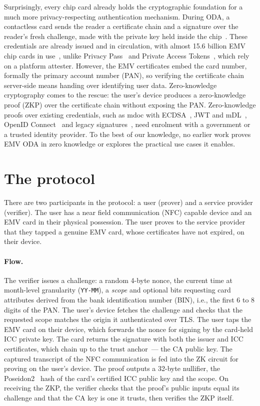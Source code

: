 \documentclass[10pt,a4paper]{article}
\begin{document}
Surprisingly, every chip card already holds the cryptographic foundation for a much more privacy-respecting authentication mechanism.
During ODA, a contactless card sends the reader a certificate chain and a signature over the reader's fresh challenge, made with the private key held inside the chip~\cite{emv-book2}.
These credentials are already issued and in circulation, with almost 15.6 billion EMV chip cards in use~\cite{emvco-stats}, unlike Privacy Pass~\cite{privacypass} and Private Access Tokens~\cite{apple-pat}, which rely on a platform attester.
However, the EMV certificates embed the card number, formally the primary account number (PAN), so verifying the certificate chain server-side means handing over identifying user data.
Zero-knowledge cryptography comes to the rescue: the user's device produces a zero-knowledge proof (ZKP) over the certificate chain without exposing the PAN.
Zero-knowledge proofs over existing credentials, such as mdoc with ECDSA~\cite{DBLP:journals/cic/FrigoS26}, JWT and mDL~\cite{DBLP:journals/iacr/PaquinPZ24}, OpenID Connect~\cite{DBLP:conf/ccs/BaldimtsiC0LMR024} and legacy signatures~\cite{DBLP:conf/sp/WooOSPG25}, need enrolment with a government or a trusted identity provider.
To the best of our knowledge, no earlier work proves EMV ODA in zero knowledge or explores the practical use cases it enables.

\section{The protocol}

There are two participants in the protocol: a user (prover) and a service provider (verifier).
The user has a near field communication (NFC) capable device and an EMV card in their physical possession.
The user proves to the service provider that they tapped a genuine EMV card, whose certificates have not expired, on their device.

\paragraph{Flow.}
The verifier issues a challenge: a random 4-byte nonce, the current time at month-level granularity (\texttt{YY-MM}), a \emph{scope} and optional bits requesting card attributes derived from the bank identification number (BIN), i.e., the first 6 to 8 digits of the PAN.
The user's device fetches the challenge and checks that the requested scope matches the origin it authenticated over TLS.
The user taps the EMV card on their device, which forwards the nonce for signing by the card-held ICC private key.
The card returns the signature with both the issuer and ICC certificates, which chain up to the trust anchor~--- the CA public key.
The captured transcript of the NFC communication is fed into the ZK circuit for proving on the user's device.
The proof outputs a 32-byte nullifier, the Poseidon2~\cite{DBLP:conf/africacrypt/GrassiKS23} hash of the card's certified ICC public key and the scope.
On receiving the ZKP, the verifier checks that the proof's public inputs equal its challenge and that the CA key is one it trusts, then verifies the ZKP itself.
\end{document}
